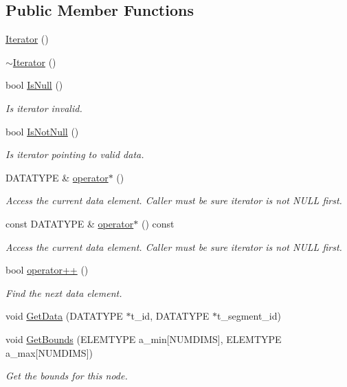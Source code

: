 \subsection*{Public Member Functions}
\begin{DoxyCompactItemize}
\item 
\hyperlink{classRTree_1_1Iterator_a59b2600d21bebdbfd5406ae42612ef7f}{Iterator} ()
\item 
\hyperlink{classRTree_1_1Iterator_a4823daecb48994f28175139ccbd763d8}{$\sim$\-Iterator} ()
\item 
bool \hyperlink{classRTree_1_1Iterator_a23f756ac37acc2b162b61230c27732b3}{Is\-Null} ()
\begin{DoxyCompactList}\small\item\em Is iterator invalid. \end{DoxyCompactList}\item 
bool \hyperlink{classRTree_1_1Iterator_a8cd6bf4fa228497ac736e8d7993e7daf}{Is\-Not\-Null} ()
\begin{DoxyCompactList}\small\item\em Is iterator pointing to valid data. \end{DoxyCompactList}\item 
D\-A\-T\-A\-T\-Y\-P\-E \& \hyperlink{classRTree_1_1Iterator_abb61d3a8396473b543cb15aa9002cfeb}{operator$\ast$} ()
\begin{DoxyCompactList}\small\item\em Access the current data element. Caller must be sure iterator is not N\-U\-L\-L first. \end{DoxyCompactList}\item 
const D\-A\-T\-A\-T\-Y\-P\-E \& \hyperlink{classRTree_1_1Iterator_a45496ad72eba6929d40239ed711bf129}{operator$\ast$} () const 
\begin{DoxyCompactList}\small\item\em Access the current data element. Caller must be sure iterator is not N\-U\-L\-L first. \end{DoxyCompactList}\item 
bool \hyperlink{classRTree_1_1Iterator_ad578bac71cfc7d324b84595032feda21}{operator++} ()
\begin{DoxyCompactList}\small\item\em Find the next data element. \end{DoxyCompactList}\item 
void \hyperlink{classRTree_1_1Iterator_abbf4f08d825f6b475b7cdb6e5bc223d7}{Get\-Data} (D\-A\-T\-A\-T\-Y\-P\-E $\ast$t\-\_\-id, D\-A\-T\-A\-T\-Y\-P\-E $\ast$t\-\_\-segment\-\_\-id)
\item 
void \hyperlink{classRTree_1_1Iterator_a65121f5016c2b1bf4696797748092709}{Get\-Bounds} (E\-L\-E\-M\-T\-Y\-P\-E a\-\_\-min\mbox{[}N\-U\-M\-D\-I\-M\-S\mbox{]}, E\-L\-E\-M\-T\-Y\-P\-E a\-\_\-max\mbox{[}N\-U\-M\-D\-I\-M\-S\mbox{]})
\begin{DoxyCompactList}\small\item\em Get the bounds for this node. \end{DoxyCompactList}\end{DoxyCompactItemize}
